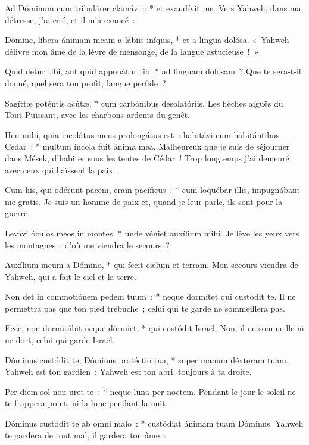 \begin{paracol}{2}

\LigneParacol
{Ad Dóminum cum tribulárer clamávi~: * et exaudívit me.}
{Vers Yahweh, dans ma détresse, j'ai crié, et il m'a exaucé~:}

\LigneParacol
{Dómine, líbera ánimam meam a lábiis iníquis, * et a lingua dolósa.}
{«~Yahweh délivre mon âme de la lèvre de mensonge, de la langue astucieuse~!~»}

\LigneParacol
{Quid detur tibi, aut quid apponátur tibi * ad linguam dolósam~?}
{Que te sera-t-il donné, quel sera ton profit, langue perfide~?}

\LigneParacol
{Sagíttæ poténtis acútæ, * cum carbónibus desolatóriis.}
{Les flèches aiguës du Tout-Puissant, avec les charbons ardents du genêt.}

\LigneParacol
{Heu mihi, quia incolátus meus prolongátus est~: habitávi cum habitántibus Cedar~: * multum íncola fuit ánima mea.}
{Malheureux que je suis de séjourner dans Mések, d'habiter sous les tentes de Cédar~! Trop longtemps j'ai demeuré avec ceux qui haïssent la paix.}

\LigneParacol
{Cum his, qui odérunt pacem, eram pacíficus~: * cum loquébar illis, impugnábant me gratis.}
{Je suis un homme de paix et, quand je leur parle, ils sont pour la guerre.}

\LigneParacol
{Levávi óculos meos in montes, * unde véniet auxílium mihi.}
{Je lève les yeux vers les montagnes~: d'où me viendra le secours~?}

\LigneParacol
{Auxílium meum a Dómino, * qui fecit cælum et terram.}
{Mon secours viendra de Yahweh, qui a fait le ciel et la terre.}

\LigneParacol
{Non det in commotiónem pedem tuum~: * neque dormítet qui custódit te.}
{Il ne permettra pas que ton pied trébuche~; celui qui te garde ne sommeillera pas.}

\LigneParacol
{Ecce, non dormitábit neque dórmiet, * qui custódit Israël.}
{Non, il ne sommeille ni ne dort, celui qui garde Israël.}

\LigneParacol
{Dóminus custódit te, Dóminus protéctio tua, * super manum déxteram tuam.}
{Yahweh est ton gardien~; Yahweh est ton abri, toujours à ta droite.}

\LigneParacol
{Per diem sol non uret te~: * neque luna per noctem.}
{Pendant le jour le soleil ne te frappera point, ni la lune pendant la nuit.}

\LigneParacol
{Dóminus custódit te ab omni malo~: * custódiat ánimam tuam Dóminus.}
{Yahweh te gardera de tout mal, il gardera ton âme~:}


\end{paracol}
